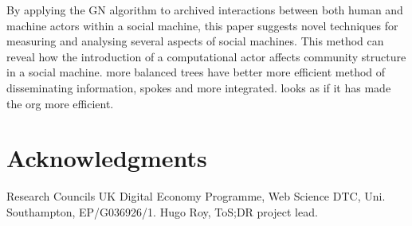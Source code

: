 \documentclass{sig-alternate}
\begin{document}
By applying the GN algorithm to archived interactions between both human and machine actors within a social machine, this paper suggests novel techniques for measuring and analysing several aspects of social machines. This method can reveal  how the introduction of a computational actor affects community structure in a social machine. more balanced trees have better more efficient method of disseminating information, spokes and more integrated. looks as if it has made the org more efficient.


\section{Acknowledgments}
Research Councils UK Digital Economy Programme, Web Science DTC, Uni. Southampton, EP/G036926/1. Hugo Roy, ToS;DR project lead.
\end{document}
